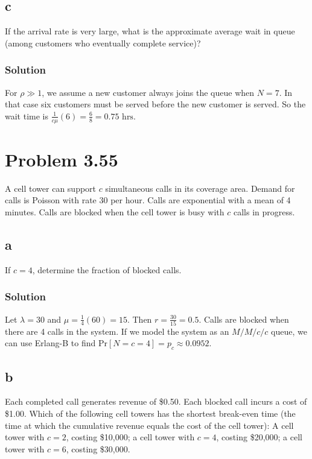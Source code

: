 \documentclass[letterpaper]{amsart}
\begin{document}
\subsection*{c}
If the arrival rate is very large, what is the approximate average wait in queue
(among customers who eventually complete service)?
\subsubsection*{Solution}
For $\rho\gg 1$, we assume a new customer always joins the queue when $N=7$.
In that case six customers must be served before the new customer is served. So
the wait time is
$\frac{1}{c\mu}(6)=\frac{6}{8}=0.75\text{\ hrs}$.
\section{Problem 3.55} %
A cell tower can support $c$ simultaneous calls in its coverage area. Demand for
calls is Poisson with rate 30 per hour. Calls are exponential with a mean of 4
minutes. Calls are blocked when the cell tower is busy with $c$ calls in progress.
\subsection*{a}
If $c = 4$, determine the fraction of blocked calls.
\subsubsection*{Solution}
Let $\lambda=30$ and $\mu=\frac{1}{4}(60) = 15$.
Then $r=\frac{30}{15}=0.5$.
Calls are blocked when there are 4 calls in the system.
If we model the system as an $M/M/c/c$ queue, we can use Erlang-B to find
$\text{Pr}[N=c=4]=p_c\approx 0.0952$.
\subsection*{b}
Each completed call generates revenue of \$0.50. Each blocked call incurs a cost
of \$1.00. Which of the following cell towers has the shortest break-even time
(the time at which the cumulative revenue equals the cost of the cell tower): A
cell tower with $c = 2$, costing \$10,000; a cell tower with $c = 4$, costing
\$20,000; a cell tower with $c = 6$, costing \$30,000.
\end{document}
